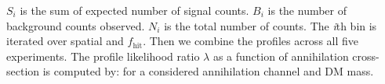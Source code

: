 $S_i$ is the sum of expected number of signal counts.
$B_i$ is the number of background counts observed.
$N_i$ is the total number of counts.
The \textit{i}th bin is iterated over spatial and $f_{\textrm{hit}}$.
Then we combine the profiles across all five experiments.
The profile likelihood ratio $\lambda$ as a function of annihilation cross-section \sv is computed by:
\gdLLHratio
for a considered annihilation channel and DM mass.





